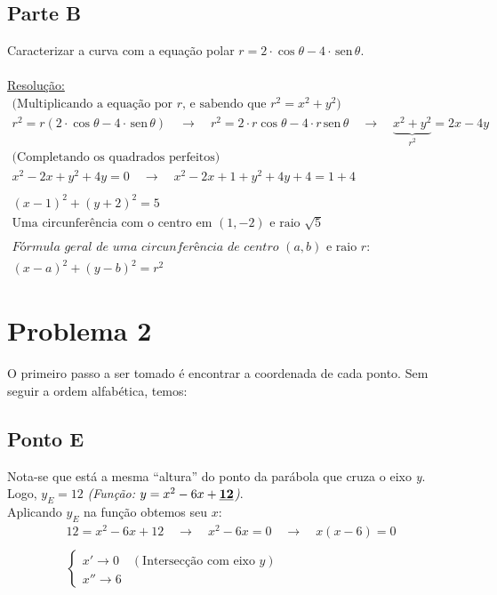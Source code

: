 \documentclass[a4paper,12pt,final]{article}
\begin{document}
\subsection*{Parte B}
Caracterizar a curva com a equação polar $r = 2\cdot\cos\theta - 4\cdot\,\textrm{sen}\,\theta$.\\
\\
\underline{Resolução:}
\begin{gather*}
\textrm{(Multiplicando a equação por }r\textrm{, e sabendo que }r^2 = x^2 + y^2\textrm{)}\\
r^2 = r(2\cdot\cos\theta - 4\cdot\,\textrm{sen}\,\theta)\quad\rightarrow\quad
r^2 = 2\cdot r\cos\theta - 4\cdot r\,\textrm{sen}\,\theta\quad\rightarrow\quad
\underbrace{x^2 + y^2}_{r^2} = 2x - 4y\\
\textrm{(Completando os quadrados perfeitos)}\\
x^2 - 2x + y^2 + 4y = 0\quad\rightarrow\quad x^2 - 2x + 1 + y^2 + 4y + 4 = 1 + 4\\\\
\boxed{(x - 1)^2 + (y + 2)^2 = 5}\\
\boxed{\textrm{Uma circunferência com o centro em }(1,-2)\textrm{ e raio }\sqrt{5}}\\\\
\textit{Fórmula geral de uma circunferência de centro }(a,b)\textrm{ e raio }r\textrm{:}\\
\boxed{(x - a)^2 + (y - b)^2 = r^2}
\end{gather*}
\newpage

\section*{Problema 2}

O primeiro passo a ser tomado é encontrar a coordenada de cada ponto. Sem seguir a ordem alfabética, temos:

\subsection*{Ponto E}
Nota-se que está a mesma ``altura'' do ponto da parábola que cruza o eixo \emph{y}. Logo, $y_E = 12$ \textit{(Função: $y = x^2 - 6x + \textbf{\underline{12}}$)}.\\
Aplicando $y_E$ na função obtemos seu $x$:\\
\begin{gather*}
12 = x^2 - 6x + 12\quad\rightarrow\quad
x^2 - 6x = 0\quad\rightarrow\quad
x(x - 6) = 0\\\\
\left\{\begin{array}{rl}
x' \rightarrow 0 & (\textrm{Intersecção com eixo }y)\\
x'' \rightarrow 6 &
\end{array}\right.
\end{gather*}
\end{document}
